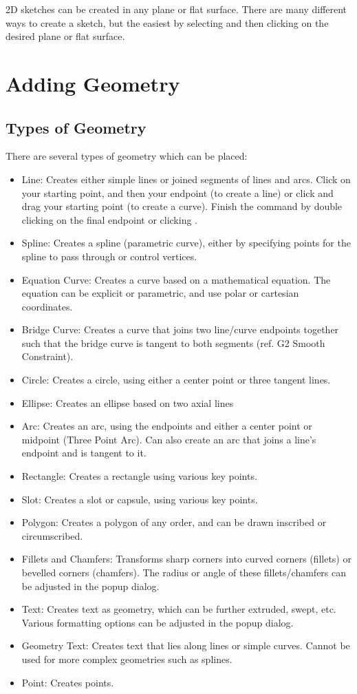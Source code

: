 2D sketches can be created in any plane or flat surface. There are many different ways to create a sketch, but the easiest by selecting  and then clicking on the desired plane or flat surface.

\section{Adding Geometry}

\subsection{Types of Geometry}

There are several types of geometry which can be placed:

\begin{itemize}
\item Line: Creates either simple lines or joined segments of lines and arcs. Click on your starting point, and then your endpoint (to create a line) or click and drag your starting point (to create a curve). Finish the command by double clicking on the final endpoint or clicking .
\item Spline: Creates a spline (parametric curve), either by specifying points for the spline to pass through or control vertices. 
\item Equation Curve: Creates a curve based on a mathematical equation. The equation can be explicit or parametric, and use polar or cartesian coordinates.
\item Bridge Curve: Creates a curve that joins two line/curve endpoints together such that the bridge curve is tangent to both segments (ref. G2 Smooth Constraint).
\item Circle: Creates a circle, using either a center point or three tangent lines.
\item Ellipse: Creates an ellipse based on two axial lines
\item Arc: Creates an arc, using the endpoints and either a center point or midpoint (Three Point Arc). Can also create an arc that joins a line's endpoint and is tangent to it.
\item Rectangle: Creates a rectangle using various key points.
\item Slot: Creates a slot or capsule, using various key points.
\item Polygon: Creates a polygon of any order, and can be drawn inscribed or circumscribed.
\item Fillets and Chamfers: Transforms sharp corners into curved corners (fillets) or bevelled corners (chamfers). The radius or angle of these fillets/chamfers can be adjusted in the popup dialog.
\item Text: Creates text as geometry, which can be further extruded, swept, etc. Various formatting options can be adjusted in the popup dialog.
\item Geometry Text: Creates text that lies along lines or simple curves. Cannot be used for more complex geometries such as splines.
\item Point: Creates points.


\end{itemize}
